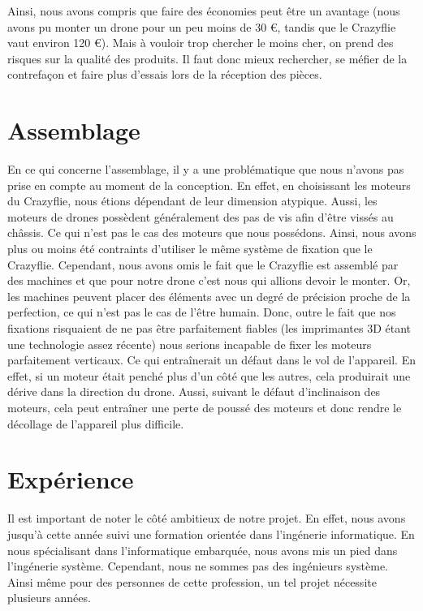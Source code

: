 \documentclass[a4paper,10pt]{report}
\begin{document}
      Ainsi, nous avons compris que faire des économies peut être un avantage 
(nous avons pu monter un drone pour un peu moins de 30 \euro, tandis que le 
Crazyflie vaut environ 120 \euro). Mais à vouloir trop chercher le moins cher, 
on prend des risques sur la qualité des produits. Il faut donc mieux 
rechercher, se méfier de la contrefaçon et faire plus d'essais lors de la 
réception des pièces.
    
    \section{Assemblage}
      En ce qui concerne l'assemblage, il y a une problématique que nous 
n'avons pas prise en compte au moment de la conception. En effet, en 
choisissant les moteurs du Crazyflie, nous étions dépendant de leur dimension 
atypique. Aussi, les moteurs de drones possèdent généralement des pas de vis 
afin d'être vissés au châssis. Ce qui n'est pas le cas des moteurs que nous 
possédons. Ainsi, nous avons plus ou moins été contraints d'utiliser le même 
système de fixation que le Crazyflie. Cependant, nous avons omis le fait que le 
Crazyflie est assemblé par des machines et que pour notre drone c'est nous qui 
allions devoir le monter. Or, les machines peuvent placer des éléments avec un 
degré de précision proche de la perfection, ce qui n'est pas le cas de l'être 
humain. Donc, outre le fait que nos fixations risquaient de ne pas être 
parfaitement fiables (les imprimantes 3D étant une technologie assez récente) 
nous serions incapable de fixer les moteurs parfaitement verticaux. Ce qui 
entraînerait un défaut dans le vol de l'appareil. En effet, si un moteur était 
penché plus d'un côté que les autres, cela produirait une dérive dans la 
direction du drone. Aussi, suivant le défaut d'inclinaison des moteurs, cela 
peut entraîner une perte de poussé des moteurs et donc rendre le décollage de 
l'appareil plus difficile.
    
    \section{Expérience}
      Il est important de noter le côté ambitieux de notre projet. En effet, 
nous avons jusqu'à cette année suivi une formation orientée dans l'ingénerie 
informatique. En nous spécialisant dans l'informatique embarquée, nous avons 
mis un pied dans l'ingénerie système. Cependant, nous ne sommes pas des 
ingénieurs système. Ainsi même pour des personnes de cette profession, un tel 
projet nécessite plusieurs années.
\end{document}
